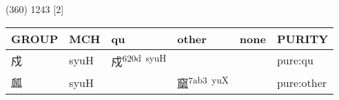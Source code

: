 \documentclass[14pt,a4paper]{scrartcl}
\begin{document}
(360) 1243 {[}2{]}

\begin{longtable}[c]{@{}llllll@{}}
\toprule
\begin{minipage}[b]{0.14\columnwidth}\raggedright\strut
GROUP
\strut\end{minipage} &
\begin{minipage}[b]{0.14\columnwidth}\raggedright\strut
MCH
\strut\end{minipage} &
\begin{minipage}[b]{0.14\columnwidth}\raggedright\strut
qu
\strut\end{minipage} &
\begin{minipage}[b]{0.14\columnwidth}\raggedright\strut
other
\strut\end{minipage} &
\begin{minipage}[b]{0.14\columnwidth}\raggedright\strut
none
\strut\end{minipage} &
\begin{minipage}[b]{0.14\columnwidth}\raggedright\strut
PURITY
\strut\end{minipage}\tabularnewline
\midrule
\endhead
\begin{minipage}[t]{0.14\columnwidth}\raggedright\strut
戍
\strut\end{minipage} &
\begin{minipage}[t]{0.14\columnwidth}\raggedright\strut
syuH
\strut\end{minipage} &
\begin{minipage}[t]{0.14\columnwidth}\raggedright\strut
戍\textsuperscript{620d~syuH}
\strut\end{minipage} &
\begin{minipage}[t]{0.14\columnwidth}\raggedright\strut
\strut\end{minipage} &
\begin{minipage}[t]{0.14\columnwidth}\raggedright\strut
\strut\end{minipage} &
\begin{minipage}[t]{0.14\columnwidth}\raggedright\strut
pure:qu
\strut\end{minipage}\tabularnewline
\begin{minipage}[t]{0.14\columnwidth}\raggedright\strut
㼌
\strut\end{minipage} &
\begin{minipage}[t]{0.14\columnwidth}\raggedright\strut
syuH
\strut\end{minipage} &
\begin{minipage}[t]{0.14\columnwidth}\raggedright\strut
\strut\end{minipage} &
\begin{minipage}[t]{0.14\columnwidth}\raggedright\strut
窳\textsuperscript{7ab3~yuX}
\strut\end{minipage} &
\begin{minipage}[t]{0.14\columnwidth}\raggedright\strut
\strut\end{minipage} &
\begin{minipage}[t]{0.14\columnwidth}\raggedright\strut
pure:other
\strut\end{minipage}\tabularnewline
\bottomrule
\end{longtable}
\end{document}
